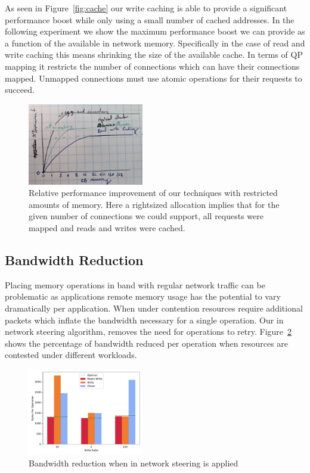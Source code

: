 As seen in Figure~\ref{fig:cache} our write caching is able to provide a
significant performance boost while only using a small number of cached
addresses. In the following experiment we show the maximum performance boost we
can provide as a function of the available in network memory. Specifically in
the case of read and write caching this means shrinking the size of the
available cache. In terms of QP mapping it restricts the number of connections
which can have their connections mapped. Unmapped connections must use atomic
operations for their requests to succeed.

\begin{figure}
    \includegraphics[width=0.45\textwidth]{fig/memory_util.jpg}
    \caption{{Relative performance improvement of our techniques with restricted amounts of memory. Here a rightsized allocation implies that for the given number of connections we could support, all requests were mapped and reads and writes were cached.}}
    \label{fig:memory_util}
\end{figure}



\subsection{Bandwidth Reduction}

Placing memory operations in band with regular network traffic can be
problematic as applications remote memory usage has the potential to vary
dramatically per application. When under contention resources require additional
packets which inflate the bandwidth necessary for a single operation. Our in
network steering algorithm, removes the need for operations to retry.
Figure~\ref{fig:bandwidth_reduction} shows the percentage of bandwidth reduced
per operation when resources are contested under different workloads.

\begin{figure}
    \includegraphics[width=0.45\textwidth]{fig/bandwidth_reduction.pdf}
    \caption{{Bandwidth reduction when in network steering is applied}}
    \label{fig:bandwidth_reduction}
\end{figure}

